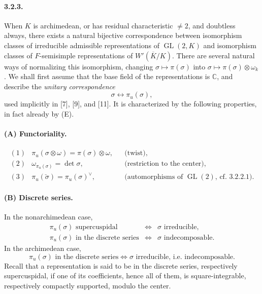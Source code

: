 \documentclass[10pt,a4paper]{article}
\providecommand{\GL}{\operatorname{GL}}
\providecommand{\C}{\mathbb C}
\begin{document}
\paragraph{3.2.3.} When \(K\) is archimedean, or has residual characteristic \(\ne2\), and doubtless always, there exists a natural bijective correspondence between isomorphism classes of irreducible admissible representations of \(\GL(2,K)\) and isomorphism classes of \(F\)-semisimple representations of \(W'(\overline K/K)\). There are several natural ways of normalizing this isomorphism, changing \(\sigma\mapsto\pi(\sigma)\) into \(\sigma\mapsto\pi(\sigma)\otimes\omega_k\). We shall first assume that the base field of the representations is \(\C\), and describe the \emph{unitary correspondence}
\[
\sigma\longleftrightarrow\pi_u(\sigma),
\]
used implicitly in [7], [9], and [11]. It is characterized by the following properties, in fact already by (E).

\paragraph{(A) Functoriality.}
\[
\begin{array}{rlrl}
(1)&\pi_u(\sigma\otimes\omega)=\pi(\sigma)\otimes\omega,&&\text{(twist)},\\[0.35em]
(2)&\omega_{\pi_u(\sigma)}=\det\sigma,&&\text{(restriction to the center)},\\[0.35em]
(3)&\pi_u(\check\sigma)=\pi_u(\sigma)^\vee,&&\text{(automorphisms of }\GL(2)\text{, cf. 3.2.2.1).}
\end{array}
\]

\paragraph{(B) Discrete series.} In the nonarchimedean case,
\[
\begin{array}{rcl}
\pi_u(\sigma)\text{ supercuspidal}&\Longleftrightarrow&\sigma\text{ irreducible},\\
\pi_u(\sigma)\text{ in the discrete series}&\Longleftrightarrow&\sigma\text{ indecomposable}.
\end{array}
\]
In the archimedean case,
\[
\pi_u(\sigma)\text{ in the discrete series}\Longleftrightarrow
\sigma\text{ irreducible, i.e. indecomposable}.
\]
Recall that a representation is said to be in the discrete series, respectively supercuspidal, if one of its coefficients, hence all of them, is square-integrable, respectively compactly supported, modulo the center.
\end{document}
